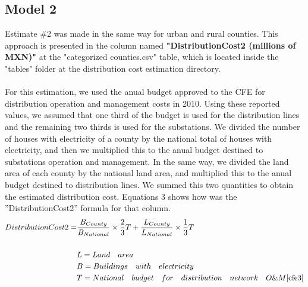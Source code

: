 \documentclass[•]{article}
\begin{document}
\subsection{Model 2}
Estimate \#2 was made in the same way for urban and rural counties. This approach is presented in the column named \textbf{"DistributionCost2 (millions of MXN)"} at the "categorized counties.csv" table, which is located inside the "tables" folder at the distribution cost estimation directory.
\\
\\For this estimation, we used the anual budget approved to the CFE for distribution operation and management costs in 2010\cite{cfe3}. Using these reported values, we assumed that one third of the budget is used for the distribution lines and the remaining two thirds is used for the substations. We divided the number of houses with electricity of a county by the national total of houses with electricity, and then we multiplied this to the anual budget destined to substations operation and management. In the same way, we divided the land area of each county by the national land area, and multiplied this to the anual budget destined to distribution lines. We summed this two quantities to obtain the estimated distribution cost. Equations 3 shows how was the ''DistributionCost2'' formula for that column.
\begin{equation}
\begin{aligned}
DistributionCost2 = & \frac{B_{County}}{B_{National}} \times \frac{2}{3} T + \frac{L_{County}}{L_{National}} \times \frac{1}{3} T 
\\
\\& L = Land\quad area
\\& B = Buildings\quad with\quad electricity
\\& T= National\quad budget\quad for\quad distribution\quad network\quad O\&M\cite{cfe3}
\end{aligned}
\end{equation}
\\
\\
\\
\end{document}
